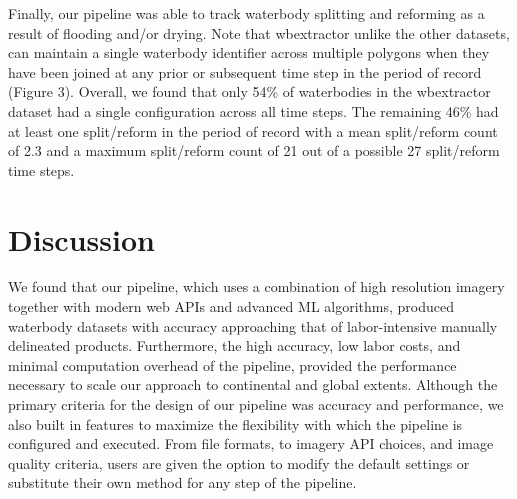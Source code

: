 \documentclass{article}
\begin{document}
Finally, our pipeline was able to track waterbody splitting and reforming as a result of flooding and/or drying. Note that wbextractor unlike the other datasets, can maintain a single waterbody identifier across multiple polygons when they have been joined at any prior or subsequent time step in the period of record (Figure 3). Overall, we found that only 54\% of waterbodies in the wbextractor dataset had a single configuration across all time steps. The remaining 46\% had at least one split/reform in the period of record with a mean split/reform count of 2.3 and a maximum split/reform count of 21 out of a possible 27 split/reform time steps.

\section{Discussion}

We found that our pipeline, which uses a combination of high resolution imagery together with modern web APIs and advanced ML algorithms, produced waterbody datasets with accuracy approaching that of labor-intensive manually delineated products. Furthermore, the high accuracy, low labor costs, and minimal computation overhead of the pipeline, provided the performance necessary to scale our approach to continental and global extents. Although the primary criteria for the design of our pipeline was accuracy and performance, we also built in features to maximize the flexibility with which the pipeline is configured and executed. From file formats, to imagery API choices, and image quality criteria, users are given the option to modify the default settings or substitute their own method for any step of the pipeline.
\end{document}
